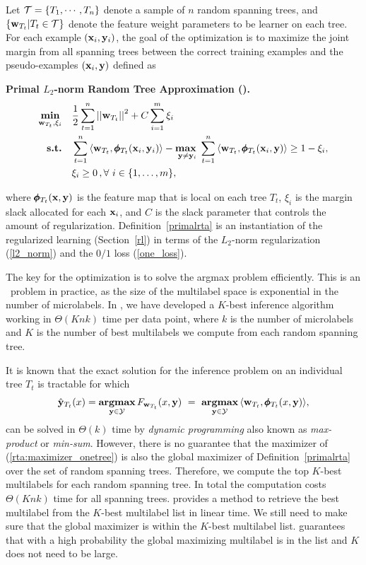 {Let $\mathcal{T}=\{T_1,\cdots,T_n\}$ denote a sample of $n$ random spanning trees, and $\{\mathbf {w}_{T_t}|T_t\in\mathcal{T}\}$ denote the feature weight parameters to be learner on each tree.
For each example $(\mathbf {x}_i,\mathbf {y}_i)$, the goal of the optimization is to maximize the joint margin from all spanning trees between the correct training examples and the pseudo-examples $(\mathbf {x}_i,\mathbf {y})$ defined as
\begin{definition}{\bf Primal $L_2$-norm Random Tree Approximation (\rta).}\label{primalrta}
	\begin{align*}
		\underset{\vw_{T_t},\xi_i}{\minimize} & \quad \frac{1}{2}\sum_{t=1}^{n}\norm{\vw_{T_t}}^2 + C\sum_{i=1}^{m}\xi_i\\
		\st & \quad \sum_{t=1}^{n}{ \langle \vw_{T_t}, \phib_{T_t}(\vx_i,\vy_i) \rangle} - \underset{\vy \neq \vy_i}{\maximize\ } \sum_{t=1}^{n}{\langle \vw_{T_t}, \phib_{T_t}(\vx_i,\vy) \rangle } \geq 1 -  \xi_i, \\
		& \quad \xi_i\ge0\, , \forall\ i \in \set{1,\dots,m},
	\end{align*}
\end{definition}
\noindent
where $\pmb \phi_{T_t}(\mathbf {x},\mathbf {y})$ is the feature map that is local on each tree $T_t$, $\xi_i$ is the margin slack allocated for each $\mathbf {x}_i$, and $C$ is the slack parameter that controls the amount of regularization.
Definition~\ref{primalrta} is an instantiation of the regularized learning (Section~\ref{rl}) in terms of the $L_2$-norm regularization (\ref{l2_norm}) and the $0/1$ loss (\ref{one_loss}).

The key for the optimization is to solve the argmax problem efficiently.
This is an \nphard\ problem in practice, as the size of the multilabel space is exponential in the number of microlabels.
In , we have developed a $K$-best inference algorithm working in $\Theta(Knk)$ time per data point, where $k$ is the number of microlabels and $K$ is the number of best multilabels we compute from each random spanning tree.

It is known that the exact solution for the inference problem on an individual tree $T_t$ is tractable \citep{Koller09probabilistic} for which 
\begin{align}
	\hat{\mathbf {y}}_{T_t}(x) = \underset{\mathbf {y}\in\mathcal{Y}}{\textbf{argmax}}\, F_{\mathbf {w}_{T_t}}(x,\mathbf {y})\ =\ \underset{\mathbf {y}\in\mathcal{Y}}{\textbf{argmax}}\, \langle \mathbf {w}_{T_t}, \pmb \phi_{T_t}(x,\mathbf {y})\rangle, \label{rta:maximizer_onetree}
\end{align}
can be solved in $\Theta(k)$ time by \textit{dynamic programming} also known as \textit{max-product} or \textit{min-sum}.
However, there is no guarantee that the maximizer of (\ref{rta:maximizer_onetree}) is also the global maximizer of Definition~\ref{primalrta} over the set of random spanning trees.
Therefore, we compute the top $K$-best multilabels for each random spanning tree.
In total the computation costs $\Theta(Knk)$ time for all spanning trees.
 provides a method to retrieve the best multilabel from the $K$-best multilabel list in linear time.
We still need to make sure that the global maximizer is within the $K$-best multilabel list.
 guarantees that with a high probability the global maximizing multilabel is in the list and $K$ does not need to be large.

}
